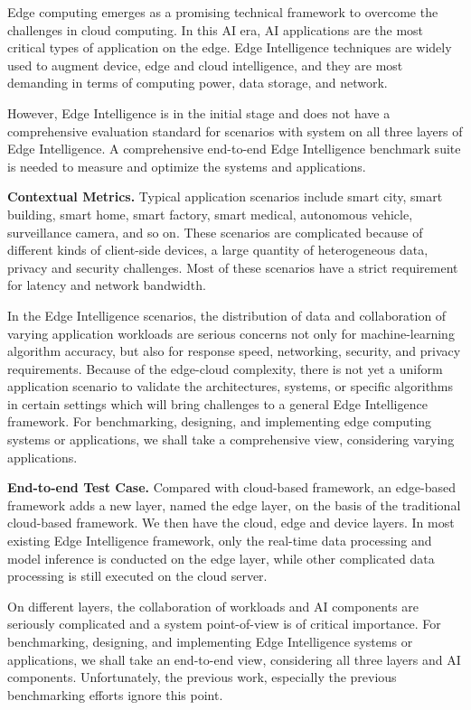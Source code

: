 Edge computing emerges as a promising technical framework to overcome the challenges in cloud computing. In this AI era, AI applications are the most critical types of application on the edge. Edge Intelligence techniques are widely used to augment device, edge and cloud intelligence, and they are most demanding in terms of computing power, data storage, and network. 

However, Edge Intelligence is in the initial stage and does not have a comprehensive evaluation standard for scenarios with system on all three layers of Edge Intelligence. A comprehensive end-to-end Edge Intelligence benchmark suite is needed to measure and optimize the systems and applications.

\textbf{Contextual Metrics.} Typical application scenarios include smart city, smart building, smart home, smart factory, smart medical, autonomous vehicle, surveillance camera, and so on. These scenarios are complicated because of different kinds of client-side devices, a large quantity of heterogeneous data, privacy and security challenges. Most of these scenarios have a strict requirement for latency and network bandwidth. 

In the Edge Intelligence scenarios, the distribution of data and collaboration of varying application workloads are serious concerns not only for machine-learning algorithm accuracy, but also for response speed, networking, security, and privacy requirements. Because of the edge-cloud complexity, there is not yet a uniform application scenario to validate the architectures, systems, or specific algorithms in certain settings which will bring challenges to a general Edge Intelligence framework. For benchmarking, designing, and implementing edge computing systems or applications, we shall take a comprehensive view, considering varying applications. 

\textbf{End-to-end Test Case.} Compared with cloud-based framework, an edge-based framework adds a new layer, named the edge layer, on the basis of the traditional cloud-based framework. We then have the cloud, edge and device layers. In most existing Edge Intelligence framework, only the real-time data processing and model inference is conducted on the edge layer, while other complicated data processing is still executed on the cloud server.

On different layers, the collaboration of workloads and AI components are seriously complicated and a system point-of-view is of critical importance. For benchmarking, designing, and implementing Edge Intelligence systems or applications, we shall take an end-to-end view, considering all three layers and AI components. Unfortunately, the previous work, especially the previous benchmarking efforts ignore this point.

